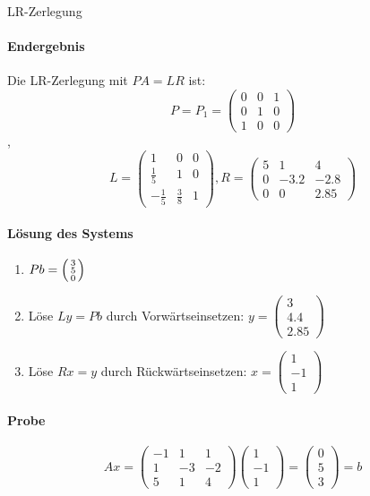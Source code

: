 \begin{example2}[breakable]{LR-Zerlegung}
\paragraph{Endergebnis}
Die LR-Zerlegung mit $PA = LR$ ist:
\vspace{2mm}\\
$$P = P_1 = \begin{pmatrix}
0 & 0 & 1\\
0 & 1 & 0\\
1 & 0 & 0
\end{pmatrix}$$, 
$$L = \begin{pmatrix}
1 & 0 & 0\\
\frac{1}{5} & 1 & 0\\
-\frac{1}{5} & \frac{3}{8} & 1
\end{pmatrix}, 
R = \begin{pmatrix}
5 & 1 & 4\\
0 & -3.2 & -2.8\\
0 & 0 & 2.85
\end{pmatrix}$$

\paragraph{Lösung des Systems}
\begin{enumerate}
    \item $Pb = \begin{psmallmatrix} 3\\ 5\\ 0 \end{psmallmatrix}$
    \item Löse $Ly = Pb$ durch Vorwärtseinsetzen:
    $y = \begin{pmatrix} 3\\ 4.4\\ 2.85 \end{pmatrix}$
    \item Löse $Rx = y$ durch Rückwärtseinsetzen:
    $x = \begin{pmatrix} 1\\ -1\\ 1 \end{pmatrix}$
\end{enumerate}

\paragraph{Probe}
$$Ax = \begin{pmatrix}
-1 & 1 & 1\\
1 & -3 & -2\\
5 & 1 & 4
\end{pmatrix} \begin{pmatrix} 1\\ -1\\ 1 \end{pmatrix} = \begin{pmatrix} 0\\ 5\\ 3 \end{pmatrix} = b$$
\end{example2}

